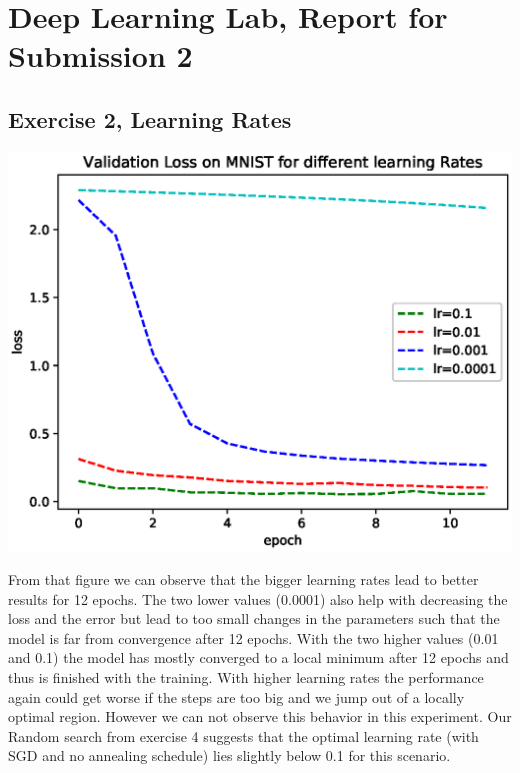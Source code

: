 \documentclass{scrartcl}
\begin{document}
\section*{Deep Learning Lab, Report for Submission 2}

\subsection*{Exercise 2, Learning Rates}
\includegraphics[scale=1]{Ex2.eps}

From that figure we can observe that the bigger learning rates lead to better results for 12 epochs. The two lower values (0.0001) also help with decreasing the loss and the error but lead to too small changes in the parameters such that the model is far from convergence after 12 epochs.
With the two higher values (0.01 and 0.1) the model has mostly converged to a local minimum after 12 epochs and thus is finished with the training. With higher learning rates the performance again could get worse if the steps are too big and we jump out of a locally optimal region. However we can not observe this behavior in this experiment. Our Random search from exercise 4 suggests that the optimal learning rate (with SGD and no annealing schedule) lies slightly below 0.1 for this scenario.
\end{document}
